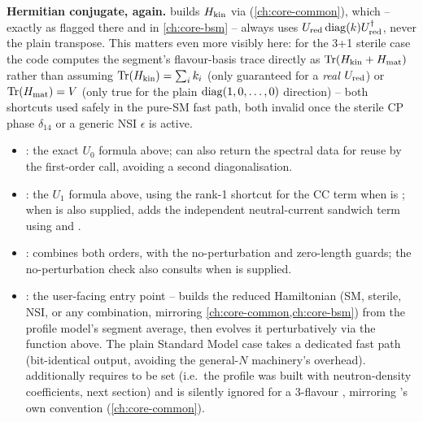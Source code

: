 \begin{notebox}
\textbf{Hermitian conjugate, again.} 
builds $H_{\rm kin}$ via 
(\cref{ch:core-common}), which -- exactly as flagged there and in
\cref{ch:core-bsm} -- always uses $U_{\rm red}\operatorname{diag}(k)U_{\rm
red}^\dagger$, never the plain transpose. This matters even more visibly
here: for the 3+1 sterile case the code computes the segment's flavour-basis
trace directly as $\Tr(H_{\rm kin}+H_{\rm mat})$ rather than assuming
$\Tr(H_{\rm kin})=\sum_ik_i$ (only guaranteed for a \emph{real} $U_{\rm
red}$) or $\Tr(H_{\rm mat})=V$ (only true for the plain
$\operatorname{diag}(1,0,\dots,0)$ direction) -- both shortcuts used safely in the
pure-SM fast path, both invalid once the sterile CP phase $\delta_{14}$ or
a generic NSI $\epsilon$ is active.
\end{notebox}

\begin{implbox}
\begin{itemize}
  \item {}: the exact $U_0$ formula
    above; can also return the spectral data for reuse by the first-order
    call, avoiding a second diagonalisation.
  \item {}:
    the $U_1$ formula above, using the rank-1 shortcut for the CC term when
     is ; when  is also supplied, adds the
    independent neutral-current sandwich term using
     and
    .
  \item {}:
    combines both orders, with the no-perturbation and zero-length guards;
    the no-perturbation check also consults
     when 
    is supplied.
  \item {}: the user-facing entry
    point -- builds the reduced Hamiltonian (SM, sterile, NSI, or any
    combination, mirroring \cref{ch:core-common,ch:core-bsm}) from the
    profile model's segment average, then evolves it perturbatively via the
    function above. The plain Standard Model case takes a dedicated fast
    path (bit-identical output, avoiding the general-$N$ machinery's
    overhead).  additionally requires
     to be set (i.e.\ the profile was
    built with neutron-density coefficients, next section) and is silently
    ignored for a 3-flavour , mirroring
    's own convention
    (\cref{ch:core-common}).
\end{itemize}
\end{implbox}


